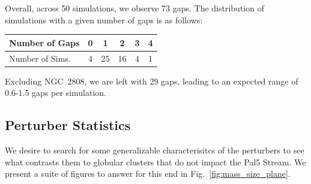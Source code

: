 \documentclass{aa}
\begin{document}
    Overall, across 50 simulations, we observe 73 gaps. The distribution of simulations with a given number of gaps is as follows: \begin{tabular}{|l|c|c|c|c|c|}
      \hline
      Number of Gaps & 0 & 1 & 2 & 3 & 4 \\
      \hline
      Number of Sims. & 4 & 25 & 16 & 4 & 1 \\
      \hline
    \end{tabular} Excluding NGC~2808, we are left with 29 gaps, leading to an expected range of 0.6-1.5 gaps per simulation.

    



 
 \subsection*{Perturber Statistics}
  

  
    We desire to search for some generalizable characterisitcs of the perturbers to see what contrasts them to globular clusters that do not impact the Pal5 Stream. We present a suite of figures to answer for this end in Fig.~\ref{fig:mass_size_plane}. 
    
\end{document}
